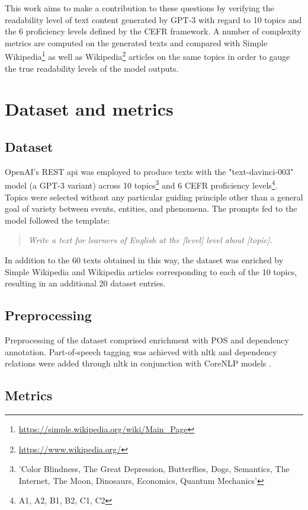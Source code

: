 \documentclass[11pt]{article}
\begin{document}
This work aims to make a contribution to these questions by verifying the readability level of text content generated by GPT-3 with regard to 10 topics and the 6 proficiency levels defined by the CEFR framework. A number of complexity metrics are computed on the generated texts and compared with Simple Wikipedia\footnote{\url{https://simple.wikipedia.org/wiki/Main_Page}} as well as Wikipedia\footnote{\url{https://www.wikipedia.org/}} articles on the same topics in order to gauge the true readability levels of the model outputs.
\section{Dataset and metrics}
\subsection{Dataset}

OpenAI's REST api was employed to produce texts with the "text-davinci-003" model (a GPT-3 variant) across 10 topics\footnote{'Color Blindness, The Great Depression, Butterflies, Dogs, Semantics, The Internet, The Moon, Dinosaurs, Economics, Quantum Mechanics'} and 6 CEFR proficiency levels\footnote{A1, A2, B1, B2, C1, C2}. Topics were selected without any particular guiding principle other than a general goal of variety between events, entities, and phenomena. The prompts fed to the model followed the template:

\begin{quote}
  \emph{Write a text for learners of English at the [level] level about [topic].}
\end{quote}

In addition to the 60 texts obtained in this way, the dataset was enriched by Simple Wikipedia and Wikipedia articles corresponding to each of the 10 topics, resulting in an additional 20 dataset entries.

\subsection{Preprocessing}

Preprocessing of the dataset comprised enrichment with POS and dependency annotation. Part-of-speech tagging was achieved with nltk \citep{LoperBird02} and dependency relations were added through nltk in conjunction with CoreNLP models \citep{corenlp}.

\subsection{Metrics}
\end{document}
